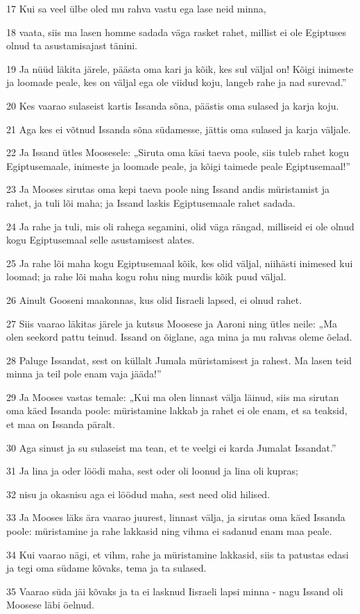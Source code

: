 \par 17 Kui sa veel ülbe oled mu rahva vastu ega lase neid minna,
\par 18 vaata, siis ma lasen homme sadada väga rasket rahet, millist ei ole Egiptuses olnud ta asustamisajast tänini.
\par 19 Ja nüüd läkita järele, päästa oma kari ja kõik, kes sul väljal on! Kõigi inimeste ja loomade peale, kes on väljal ega ole viidud koju, langeb rahe ja nad surevad.”
\par 20 Kes vaarao sulaseist kartis Issanda sõna, päästis oma sulased ja karja koju.
\par 21 Aga kes ei võtnud Issanda sõna südamesse, jättis oma sulased ja karja väljale.
\par 22 Ja Issand ütles Moosesele: „Siruta oma käsi taeva poole, siis tuleb rahet kogu Egiptusemaale, inimeste ja loomade peale, ja kõigi taimede peale Egiptusemaal!”
\par 23 Ja Mooses sirutas oma kepi taeva poole ning Issand andis müristamist ja rahet, ja tuli lõi maha; ja Issand laskis Egiptusemaale rahet sadada.
\par 24 Ja rahe ja tuli, mis oli rahega segamini, olid väga rängad, milliseid ei ole olnud kogu Egiptusemaal selle asustamisest alates.
\par 25 Ja rahe lõi maha kogu Egiptusemaal kõik, kes olid väljal, niihästi inimesed kui loomad; ja rahe lõi maha kogu rohu ning murdis kõik puud väljal.
\par 26 Ainult Gooseni maakonnas, kus olid Iisraeli lapsed, ei olnud rahet.
\par 27 Siis vaarao läkitas järele ja kutsus Moosese ja Aaroni ning ütles neile: „Ma olen seekord pattu teinud. Issand on õiglane, aga mina ja mu rahvas oleme õelad.
\par 28 Paluge Issandat, sest on küllalt Jumala müristamisest ja rahest. Ma lasen teid minna ja teil pole enam vaja jääda!”
\par 29 Ja Mooses vastas temale: „Kui ma olen linnast välja läinud, siis ma sirutan oma käed Issanda poole: müristamine lakkab ja rahet ei ole enam, et sa teaksid, et maa on Issanda päralt.
\par 30 Aga sinust ja su sulaseist ma tean, et te veelgi ei karda Jumalat Issandat.”
\par 31 Ja lina ja oder löödi maha, sest oder oli loonud ja lina oli kupras;
\par 32 nisu ja okasnisu aga ei löödud maha, sest need olid hilised.
\par 33 Ja Mooses läks ära vaarao juurest, linnast välja, ja sirutas oma käed Issanda poole: müristamine ja rahe lakkasid ning vihma ei sadanud enam maa peale.
\par 34 Kui vaarao nägi, et vihm, rahe ja müristamine lakkasid, siis ta patustas edasi ja tegi oma südame kõvaks, tema ja ta sulased.
\par 35 Vaarao süda jäi kõvaks ja ta ei lasknud Iisraeli lapsi minna - nagu Issand oli Moosese läbi öelnud.

